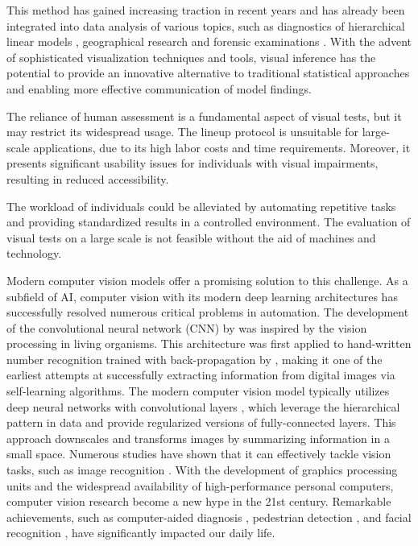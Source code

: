 \documentclass[11pt,a4paper,]{article}
\begin{document}
This method has gained increasing traction in recent years and has already been integrated into data analysis of various topics, such as diagnostics of hierarchical linear models \autocite{loy2013diagnostic}, geographical research \autocite{widen_graphical_2016} and forensic examinations \autocite{krishnan_hierarchical_2021}. With the advent of sophisticated visualization techniques and tools, visual inference has the potential to provide an innovative alternative to traditional statistical approaches and enabling more effective communication of model findings.

The reliance of human assessment is a fundamental aspect of visual tests, but it may restrict its widespread usage. The lineup protocol is unsuitable for large-scale applications, due to its high labor costs and time requirements. Moreover, it presents significant usability issues for individuals with visual impairments, resulting in reduced accessibility.

The workload of individuals could be alleviated by automating repetitive tasks and providing standardized results in a controlled environment. The evaluation of visual tests on a large scale is not feasible without the aid of machines and technology.

Modern computer vision models offer a promising solution to this challenge. As a subfield of AI, computer vision with its modern deep learning architectures has successfully resolved numerous critical problems in automation. The development of the convolutional neural network (CNN) by \textcite{fukushima_neocognitron_1982} was inspired by the vision processing in living organisms. This architecture was first applied to hand-written number recognition trained with back-propagation by \textcite{lecun_backpropagation_1989}, making it one of the earliest attempts at successfully extracting information from digital images via self-learning algorithms. The modern computer vision model typically utilizes deep neural networks with convolutional layers \autocite{fukushima_neocognitron_1982}, which leverage the hierarchical pattern in data and provide regularized versions of fully-connected layers. This approach downscales and transforms images by summarizing information in a small space. Numerous studies have shown that it can effectively tackle vision tasks, such as image recognition \autocite{rawat_deep_2017}. With the development of graphics processing units and the widespread availability of high-performance personal computers, computer vision research become a new hype in the 21st century. Remarkable achievements, such as computer-aided diagnosis \autocite{lee_image_2015}, pedestrian detection \autocite{brunetti_computer_2018}, and facial recognition \autocite{emami_facial_2012}, have significantly impacted our daily life.
\end{document}
